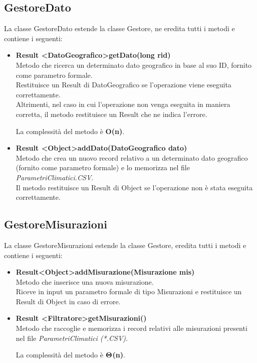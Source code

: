 \documentclass[a4paper, 12pt]{scrreprt}
\begin{document}
			\subsection{GestoreDato}
			La classe GestoreDato estende la classe Gestore, ne eredita tutti i metodi e contiene i seguenti:
			\begin{itemize}
				\item \textbf{Result \textless DatoGeografico\textgreater getDato(long rid)}
				\\Metodo che ricerca un determinato dato geografico in base al suo ID, fornito come parametro formale.
				\\Restituisce un Result di DatoGeografico se l'operazione viene eseguita correttamente.
				\\Altrimenti, nel caso in cui l'operazione non venga eseguita in maniera corretta, il metodo restituisce un Result che ne indica l'errore.
				
				La complessit\`a del metodo \`e \textbf{O(n)}.
				
				\item \textbf {Result \textless Object\textgreater addDato(DatoGeografico dato)}
				\\Metodo che crea un nuovo record relativo a un determinato dato geografico (fornito come parametro formale) e lo memorizza nel file \textit{ParametriClimatici.CSV}.
				\\Il metodo restituisce un Result di Object se l'operazione non \`e stata eseguita correttamente.
			\end{itemize}

			\subsection{GestoreMisurazioni}
			La classe GestoreMisurazioni estende la classe Gestore, eredita tutti i metodi e contiene i seguenti:
			\begin{itemize}
				\item \textbf{Result\textless Object\textgreater addMisurazione(Misurazione mis)}
				\\Metodo che inserisce una nuova misurazione.
				\\Riceve in input un parametro formale di tipo Misurazioni e restituisce un Result di Object in caso di errore.

				\item \textbf {Result \textless Filtratore\textgreater getMisurazioni()}
				\\Metodo che raccoglie e memorizza i record relativi alle misurazioni presenti nel file \textit{ParametriClimatici (*.CSV)}.
				
				La complessit\`a del metodo \`e $\mathbf{\Theta}$\textbf{(n)}.
			\end{itemize}
\end{document}
